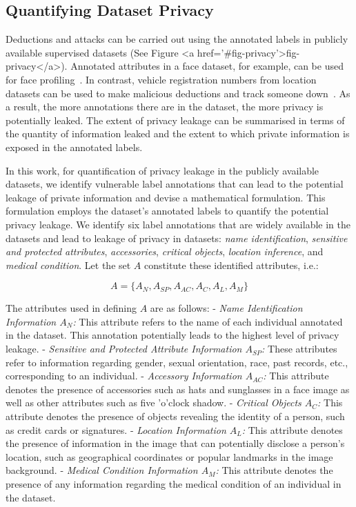 \documentclass[journal]{IEEEtran}
\begin{document}
\subsection{Quantifying Dataset Privacy} Deductions and attacks can be carried out using the annotated labels in publicly available supervised datasets (See Figure <a href='#fig-privacy'>fig-privacy</a>). Annotated attributes in a face dataset, for example, can be used for face profiling~\cite{findface, facepp, socialmapper, gnanasekar2019face}. In contrast, vehicle registration numbers from location datasets can be used to make malicious deductions and track someone down~\cite{orekondy2017towards,5958033}. As a result, the more annotations there are in the dataset, the more privacy is potentially leaked. The extent of privacy leakage can be summarised in terms of the quantity of information leaked and the extent to which private information is exposed in the annotated labels. 

\noindent In this work, for quantification of privacy leakage in the publicly available datasets, we identify vulnerable label annotations that can lead to the potential leakage of private information and devise a mathematical formulation. This formulation employs the dataset's annotated labels to quantify the potential privacy leakage. We identify six label annotations that are widely available in the datasets and lead to leakage of privacy in datasets: \textit{name identification}, \textit{sensitive and protected attributes}, \textit{accessories}, \textit{critical objects}, \textit{location inference}, and \textit{medical condition}. 
Let the set $A$ constitute these identified attributes, i.e.:

\begin{equation}
A = \{A_N, A_{SP}, A_{AC}, A_C, A_L, A_M\}
\end{equation}

The attributes used in defining $A$ are as follows:
-  \textit{Name Identification Information $A_N$:} This attribute refers to the name of each individual annotated in the dataset. This annotation potentially leads to the highest level of privacy leakage.
-  \textit{Sensitive and Protected Attribute Information $A_{SP}$:} These attributes refer to information regarding gender, sexual orientation, race, past records, etc., corresponding to an individual.
-  \textit{Accessory Information $A_{AC}$:} This attribute denotes the presence of accessories such as hats and sunglasses in a face image as well as other attributes such as five 'o'clock shadow.
-  \textit{Critical Objects $A_C$:} This attribute denotes the presence of objects revealing the identity of a person, such as credit cards or signatures.
-  \textit{Location Information $A_L$:} This attribute denotes the presence of information in the image that can potentially disclose a person's location, such as geographical coordinates or popular landmarks in the image background.
-  \textit{Medical Condition Information $A_M$:} This attribute denotes the presence of any information regarding the medical condition of an individual in the dataset.
\end{document}
